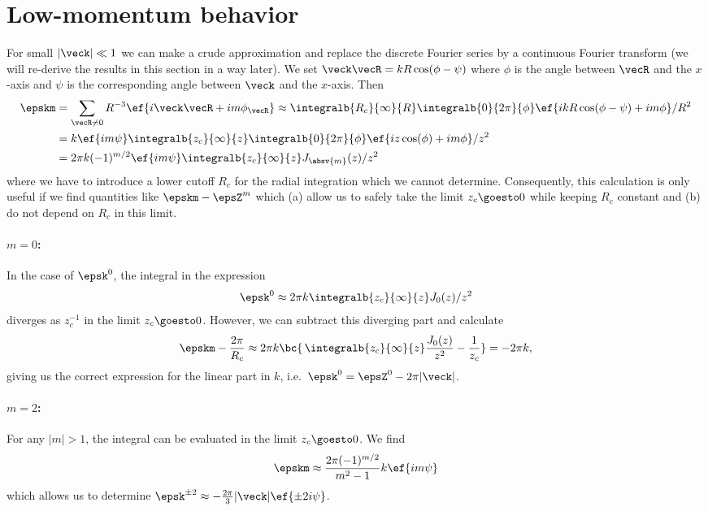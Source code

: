 \section{Low-momentum behavior}
For small $|\veck| \ll 1$ we can make a crude approximation and replace the discrete Fourier series
by a continuous Fourier transform (we will re-derive the results in this section in a  way later). We set $\veck\vecR = k R \cos(\phi-\psi)$ where
$\phi$ is the angle between $\vecR$ and the $x$-axis and $\psi$ is the
corresponding angle between $\veck$ and the $x$-axis. Then
\begin{align}
    \epskm &= \sum_{\vecR\ne 0} R^{-3} \ef{i\veck\vecR+i m \phi_\vecR}
    \approx \integralb{R_c}{\infty}{R} \integralb{0}{2\pi}{\phi} \ef{ikR \cos(\phi-\psi) + i m \phi} / R^2\\
    &= k \ef{im \psi} \integralb{z_c}{\infty}{z} \integralb{0}{2\pi}{\phi} \ef{i z \cos(\phi) + i m \phi} / z^2\\
    &= 2\pi k (-1)^{m/2} \ef{i m \psi} \integralb{z_c}{\infty}{z} J_{\absv{m}}(z)/z^2
\end{align}
where we have to introduce a lower cutoff $R_c$ for the radial integration which
we cannot determine. Consequently, this calculation is only useful
if we find quantities like $\epskm-\epsZ^m$ which (a) allow
us to safely take the limit $z_c \goesto 0$ while keeping $R_c$ constant and
(b) do not depend on $R_c$ in this limit.

\paragraph{$m=0$:} In the case of $\epsk^0$, the integral in the expression
\begin{align}
    \epsk^0 \approx 2\pi k \integralb{z_c}{\infty}{z} J_0(z)/z^2
\end{align}
diverges as $z_c^{-1}$ in the limit $z_c \goesto 0$. However, we can subtract this diverging part and calculate
\begin{align}
    \epskm - \frac{2\pi}{R_c} \approx 2\pi k \bc{ \, \integralb{z_c}{\infty}{z} \frac{J_0(z)}{z^2} - \frac{1}{z_c} } = -2\pi k,
\end{align}
giving us the correct expression for the linear part in $k$, i.e.~$\epsk^0=\epsZ^0 - 2\pi |\veck|$.

\paragraph{$m=2$:} For any $|m|>1$, the integral can be evaluated in the limit $z_c\goesto 0$. We find
\begin{align}
    \epskm \approx \frac{2\pi (-1)^{m/2}}{m^2-1} k \ef{im \psi}
\end{align}
which allows us to determine $\epsk^{\pm 2} \approx -\frac{2\pi}{3} |\veck| \ef{\pm 2 i \psi}$.

